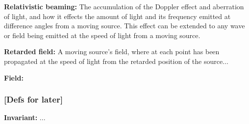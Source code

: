 \noindent \hypertarget{def-relativistic-beaming}{\textbf{Relativistic beaming:}}
The accumulation of the Doppler effect and aberration of light, and how it effects the amount of light and its frequency emitted at difference angles from a moving source. This effect can be extended to any wave or field being emitted at the speed of light from a moving source.

\noindent \hypertarget{def-retarded-field}{\textbf{Retarded field:}}
A moving source's field, where at each point has been propagated at the speed of light from the retarded position of the source...

\noindent \hypertarget{def-field}{\textbf{Field:}}


\subsubsection{[Defs for later]}%

\noindent \hypertarget{def-lorentz-invariant}{\textbf{Invariant:}}
...
